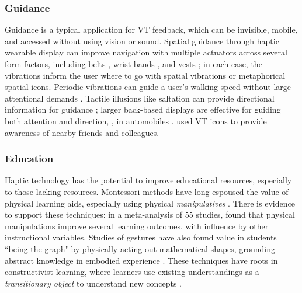 \subsubsection{Guidance}
Guidance is a typical application for VT feedback, which can be invisible, mobile, and accessed without using vision or sound.
Spatial guidance through haptic wearable display can improve navigation with multiple actuators across several form factors, including belts \cite{Pielot2009,Lindeman2005}, wrist-bands \cite{Arab2015}, and vests \cite{Prasad2014}; in each case, the vibrations inform the user where to go with spatial vibrations or metaphorical spatial icons.
Periodic vibrations can guide a user's walking speed without large attentional demands \cite{Karuei2014}.
Tactile illusions like saltation can provide directional information for guidance \cite{Tan1997}; larger back-based displays are effective for guiding both attention and direction, \eg, in automobiles \cite{Tan2003}.
\citet{Brewster2010} used VT icons to provide awareness of nearby friends and colleagues.





\subsubsection{Education}
Haptic technology has the potential to improve educational resources, especially to those lacking resources.
Montessori methods have long espoused the value of physical learning aids, especially using physical \emph{manipulatives} \cite{Montessori1917}.
There is evidence to support these techniques: in a meta-analysis of 55 studies, \citet{Carbonneau2013} found that physical manipulations improve several learning outcomes, with influence by other instructional variables.
Studies of gestures have also found value in students ``being the graph" by physically acting out mathematical shapes, grounding abstract knowledge in embodied experience \cite{Gerofsky2010}.
These techniques have roots in constructivist learning, where learners use existing understandings as a \emph{transitionary object} to understand new concepts \cite{Papert1980}.

